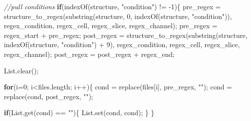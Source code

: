 \documentclass[
  12pt,
  a4paper,
]{book}
\newenvironment{Shaded}{}{}
\newcommand{\CommentTok}[1]{\textcolor[rgb]{0.38,0.63,0.69}{\textit{#1}}}
\newcommand{\ControlFlowTok}[1]{\textcolor[rgb]{0.00,0.44,0.13}{\textbf{#1}}}
\newcommand{\DecValTok}[1]{\textcolor[rgb]{0.25,0.63,0.44}{#1}}
\newcommand{\NormalTok}[1]{#1}
\newcommand{\OperatorTok}[1]{\textcolor[rgb]{0.40,0.40,0.40}{#1}}
\newcommand{\StringTok}[1]{\textcolor[rgb]{0.25,0.44,0.63}{#1}}
\begin{document}
\begin{Shaded}
\begin{Highlighting}[]
\CommentTok{//pull conditions}
\ControlFlowTok{if}\OperatorTok{(}\NormalTok{indexOf}\OperatorTok{(}\NormalTok{structure}\OperatorTok{,} \StringTok{"condition"}\OperatorTok{)} \OperatorTok{!=} \OperatorTok{{-}}\DecValTok{1}\OperatorTok{)\{}
\NormalTok{    pre\_regex }\OperatorTok{=}\NormalTok{ structure\_to\_regex}\OperatorTok{(}\NormalTok{substring}\OperatorTok{(}\NormalTok{structure}\OperatorTok{,} \DecValTok{0}\OperatorTok{,}\NormalTok{ indexOf}\OperatorTok{(}\NormalTok{structure}\OperatorTok{,} \StringTok{"condition"}\OperatorTok{)),}\NormalTok{ regex\_condition}\OperatorTok{,}\NormalTok{ regex\_cell}\OperatorTok{,}\NormalTok{ regex\_slice}\OperatorTok{,}\NormalTok{ regex\_channel}\OperatorTok{);}
\NormalTok{    pre\_regex }\OperatorTok{=}\NormalTok{ regex\_start }\OperatorTok{+}\NormalTok{ pre\_regex}\OperatorTok{;}
\NormalTok{    post\_regex }\OperatorTok{=}\NormalTok{ structure\_to\_regex}\OperatorTok{(}\NormalTok{substring}\OperatorTok{(}\NormalTok{structure}\OperatorTok{,}\NormalTok{ indexOf}\OperatorTok{(}\NormalTok{structure}\OperatorTok{,} \StringTok{"condition"}\OperatorTok{)} \OperatorTok{+} \DecValTok{9}\OperatorTok{),}\NormalTok{ regex\_condition}\OperatorTok{,}\NormalTok{ regex\_cell}\OperatorTok{,}\NormalTok{ regex\_slice}\OperatorTok{,}\NormalTok{ regex\_channel}\OperatorTok{);}
\NormalTok{    post\_regex }\OperatorTok{=}\NormalTok{ post\_regex }\OperatorTok{+}\NormalTok{ regex\_end}\OperatorTok{;}
    
\NormalTok{    List}\OperatorTok{.}\NormalTok{clear}\OperatorTok{();}
    
    \ControlFlowTok{for}\OperatorTok{(}\NormalTok{i}\OperatorTok{=}\DecValTok{0}\OperatorTok{;}\NormalTok{ i}\OperatorTok{\textless{}}\NormalTok{files}\OperatorTok{.}\NormalTok{length}\OperatorTok{;}\NormalTok{ i}\OperatorTok{++)\{}
\NormalTok{        cond }\OperatorTok{=}\NormalTok{ replace}\OperatorTok{(}\NormalTok{files}\OperatorTok{[}\NormalTok{i}\OperatorTok{],}\NormalTok{ pre\_regex}\OperatorTok{,} \StringTok{""}\OperatorTok{);}
\NormalTok{        cond }\OperatorTok{=}\NormalTok{ replace}\OperatorTok{(}\NormalTok{cond}\OperatorTok{,}\NormalTok{ post\_regex}\OperatorTok{,} \StringTok{""}\OperatorTok{);}
        
        \ControlFlowTok{if}\OperatorTok{(}\NormalTok{List}\OperatorTok{.}\NormalTok{get}\OperatorTok{(}\NormalTok{cond}\OperatorTok{)} \OperatorTok{==} \StringTok{""}\OperatorTok{)\{}
\NormalTok{            List}\OperatorTok{.}\NormalTok{set}\OperatorTok{(}\NormalTok{cond}\OperatorTok{,}\NormalTok{ cond}\OperatorTok{);}
        \OperatorTok{\}}
    \OperatorTok{\}}
    

\end{Highlighting}
\end{Shaded}
\end{document}
